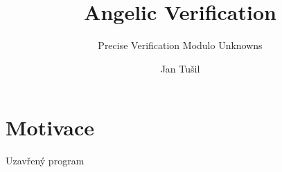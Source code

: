 \documentclass[11pt]{beamer}
\author{Jan Tušil}
\title{Angelic Verification}
\subtitle{Precise Verification Modulo Unknowns}
\begin{document}
\begin{frame}
\titlepage
\end{frame}

\begin{frame}
\tableofcontents
\end{frame}

\section{Motivace}


\begin{frame}[fragile]{Uzavřený program}


\end{frame}






\end{document}

